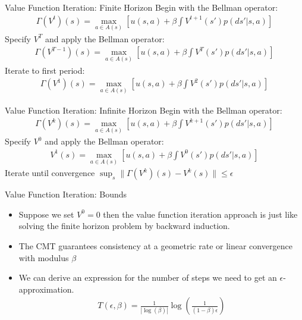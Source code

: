 \documentclass[xcolor=pdftex,dvipsnames,table,mathserif,aspectratio=169]{beamer}
\begin{document}
\begin{frame}{Value Function Iteration: Finite Horizon}
Begin with the Bellman operator:
\begin{eqnarray*}
\Gamma(V^t)(s) = \max_{a \in A(s)} \left[ u(s,a) + \beta \int V^{t+1}(s')p(ds' | s,a) \right]
\end{eqnarray*}
Specify $V^T$ and apply the Bellman operator:
\begin{eqnarray*}
\Gamma(V^{T-1})(s) = \max_{a \in A(s)} \left[ u(s,a) + \beta \int V^{T}(s')p(ds' | s,a) \right]
\end{eqnarray*}
Iterate to first period:
\begin{eqnarray*}
\Gamma(V^1)(s) = \max_{a \in A(s)} \left[ u(s,a) + \beta \int V^{2}(s')p(ds' | s,a) \right]
\end{eqnarray*}
\end{frame}

\begin{frame}{Value Function Iteration: Infinite Horizon}
Begin with the Bellman operator:
\begin{eqnarray*}
\Gamma(V^k)(s) = \max_{a \in A(s)} \left[ u(s,a) + \beta \int V^{k+1}(s')p(ds' | s,a) \right]
\end{eqnarray*}
Specify $V^0$ and apply the Bellman operator:
\begin{eqnarray*}
V^{1}(s) = \max_{a \in A(s)} \left[ u(s,a) + \beta \int V^{0}(s')p(ds' | s,a) \right]
\end{eqnarray*}
Iterate until convergence  $ \sup_s \| \Gamma(V^k)(s) - V^k(s) \| \leq \epsilon $
\end{frame}

\begin{frame}{Value Function Iteration: Bounds}
\begin{itemize}
\item Suppose we set $V^0 =0$ then the value function iteration approach is just like solving the finite horizon problem by backward induction.
\item The CMT guarantees consistency at a geometric rate or \alert{linear} convergence with modulus $\beta$
\item We can derive an expression for the number of steps we need to get an $\epsilon$-approximation.
\begin{eqnarray*}
T(\epsilon,\beta) = \frac{1}{| \log(\beta) | } \log \left (\frac{1}{(1-\beta)\epsilon} \right)
\end{eqnarray*}
\end{itemize}
\end{frame}
\end{document}
